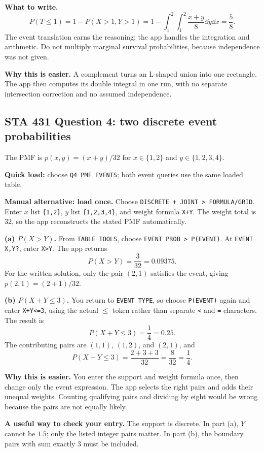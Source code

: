 \textbf{What to write.}
\[
P(T\le1)=1-P(X>1,Y>1)
=1-\int_1^2\int_1^2\frac{x+y}{8}\dd y\dd x
=\frac58.
\]
The event translation earns the reasoning; the app handles the integration and arithmetic. Do not multiply marginal survival probabilities, because independence was not given.

\textbf{Why this is easier.} A complement turns an L-shaped union into one rectangle. The app then computes its double integral in one run, with no separate intersection correction and no assumed independence.

\clearpage
\subsection{STA 431 Question 4: two discrete event probabilities}
The PMF is $p(x,y)=(x+y)/32$ for $x\in\{1,2\}$ and $y\in\{1,2,3,4\}$.

\textbf{Quick load:} choose \texttt{Q4 PMF EVENTS}; both event queries use the same loaded table.\par
\textbf{Manual alternative: load once.} Choose \texttt{DISCRETE + JOINT > FORMULA/GRID}. Enter $x$ list \texttt{\{1,2\}}, $y$ list \texttt{\{1,2,3,4\}}, and weight formula \texttt{X+Y}. The weight total is 32, so the app reconstructs the stated PMF automatically.

\textbf{(a) $P(X>Y)$.} From \texttt{TABLE TOOLS}, choose \texttt{EVENT PROB > P(EVENT)}. At \texttt{EVENT X,Y?}, enter \texttt{X>Y}. The app returns
\[
\boxed{P(X>Y)=\frac3{32}=0.09375.}
\]
For the written solution, only the pair $(2,1)$ satisfies the event, giving $p(2,1)=(2+1)/32$.

\textbf{(b) $P(X+Y\le3)$.} You return to \texttt{EVENT TYPE}, so choose \texttt{P(EVENT)} again and enter \texttt{X+Y<=3}, using the actual $\le$ token rather than separate \texttt{<} and \texttt{=} characters. The result is
\[
\boxed{P(X+Y\le3)=\frac14=0.25.}
\]
The contributing pairs are $(1,1)$, $(1,2)$, and $(2,1)$, and
\[
P(X+Y\le3)=\frac{2+3+3}{32}=\frac8{32}=\frac14.
\]

\textbf{Why this is easier.} You enter the support and weight formula once, then change only the event expression. The app selects the right pairs and adds their unequal weights. Counting qualifying pairs and dividing by eight would be wrong because the pairs are not equally likely.

\textbf{A useful way to check your entry.} The support is discrete. In part (a), $Y$ cannot be $1.5$; only the listed integer pairs matter. In part (b), the boundary pairs with sum exactly 3 must be included.

